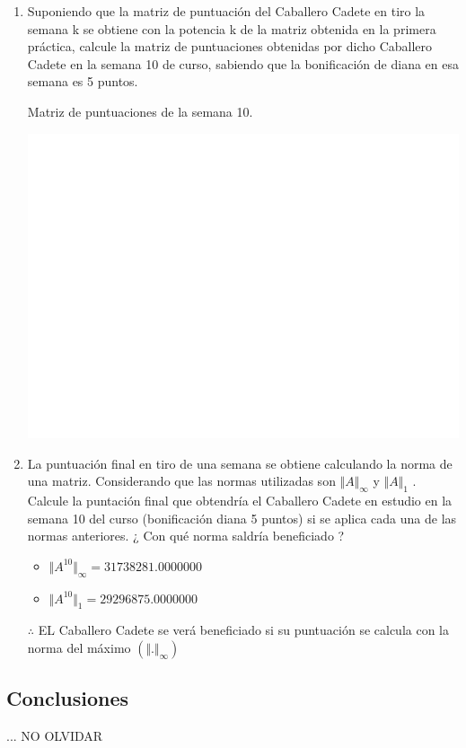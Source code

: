 \documentclass[12pt,a4paper]{article}
\begin{document}
\begin{enumerate}
	\item Suponiendo que la matriz de puntuación del Caballero Cadete en tiro la semana k se obtiene con la potencia k de la matriz obtenida en la primera práctica, calcule la matriz de puntuaciones obtenidas por dicho Caballero Cadete en la semana 10 de curso, sabiendo que la bonificación de diana en esa semana es 5 puntos.
	
	Matriz de puntuaciones de la semana  10.
	\begin{center}
		\includegraphics[page=3,trim= 4.3cm 4cm 4cm 4cm, clip, scale=0.75]{MatrixSimb}
	\end{center}
	
	\item La puntuación final en tiro de una semana se obtiene calculando la norma de una matriz. Considerando que las normas utilizadas son $\Vert A\Vert_{\infty}$ y $\Vert A\Vert_{1}$ . Calcule la puntación final que obtendría el Caballero Cadete en estudio en la semana 10 del curso (bonificación diana 5 puntos) si se aplica cada una de las normas anteriores. ¿ Con qué norma saldría beneficiado ?
		\begin{itemize}
			\item $\Vert A^{10}\Vert_{\infty} = 31738281.0000000$
			\item $\Vert A^{10}\Vert_{1} = 29296875.0000000$
		\end{itemize}
		$\therefore$ EL Caballero Cadete se verá beneficiado si su puntuación se calcula con la norma del máximo $(\Vert .\Vert_{\infty})$
\end{enumerate}

\begin{multicols}{2}
	\section{Conclusiones}
	... NO OLVIDAR
\end{multicols}
\end{document}
